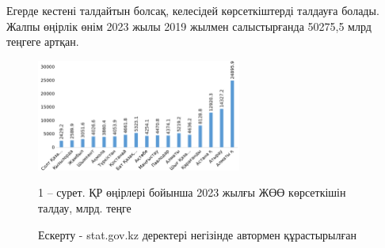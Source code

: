   
  

Егерде кестені талдайтын болсақ, келесідей көрсеткіштерді талдауға
болады. Жалпы өңірлік өнім 2023 жылы 2019 жылмен салыстырғанда 50275,5
млрд теңгеге артқан.

\begin{figure}[H]
	\centering
	\includegraphics[width=0.6\textwidth]{media/ekon/image1000}
	\caption*{1 -- сурет. ҚР өңірлері бойынша 2023 жылғы ЖӨӨ көрсеткішін
талдау, млрд. теңге}
	\caption*{Ескерту - stat.gov.kz деректері негізінде автормен құрастырылған}
\end{figure}

